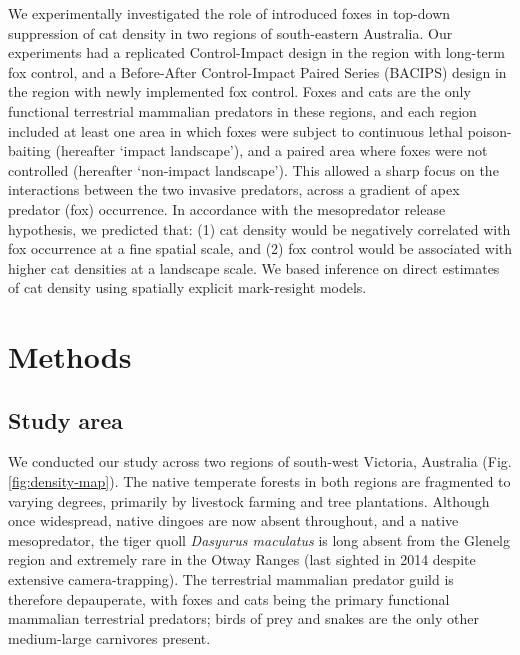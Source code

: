 \documentclass[11pt,a4paper,titlepage,twoside,openright]{style/unimelbthesis}
\begin{document}
\begin{mainmatter}
We experimentally investigated the role of introduced foxes in top-down suppression of cat density in two regions of south-eastern Australia. Our experiments had a replicated Control-Impact design in the region with long-term fox control, and a Before-After Control-Impact Paired Series (BACIPS) design in the region with newly implemented fox control. Foxes and cats are the only functional terrestrial mammalian predators in these regions, and each region included at least one area in which foxes were subject to continuous lethal poison-baiting (hereafter `impact landscape'), and a paired area where foxes were not controlled (hereafter `non-impact landscape'). This allowed a sharp focus on the interactions between the two invasive predators, across a gradient of apex predator (fox) occurrence. In accordance with the mesopredator release hypothesis, we predicted that: (1) cat density would be negatively correlated with fox occurrence at a fine spatial scale, and (2) fox control would be associated with higher cat densities at a landscape scale. We based inference on direct estimates of cat density using spatially explicit mark-resight models.

\newpage

\hypertarget{methods-2}{%
\section{Methods}\label{methods-2}}

\hypertarget{study-area-1}{%
\subsection{Study area}\label{study-area-1}}

We conducted our study across two regions of south-west Victoria, Australia (Fig. \ref{fig:density-map}). The native temperate forests in both regions are fragmented to varying degrees, primarily by livestock farming and tree plantations. Although once widespread, native dingoes are now absent throughout, and a native mesopredator, the tiger quoll \emph{Dasyurus maculatus} is long absent from the Glenelg region and extremely rare in the Otway Ranges (last sighted in 2014 despite extensive camera-trapping). The terrestrial mammalian predator guild is therefore depauperate, with foxes and cats being the primary functional mammalian terrestrial predators; birds of prey and snakes are the only other medium-large carnivores present.


\end{mainmatter}
\end{document}
